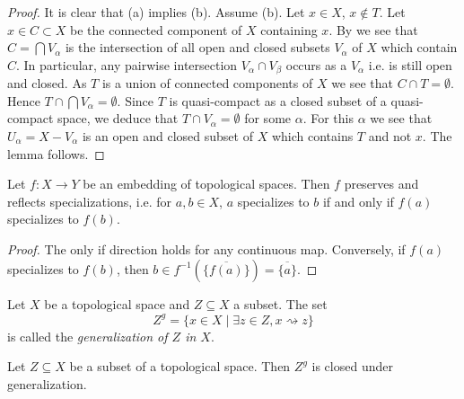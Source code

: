 \begin{proof}
  It is clear that (a) implies (b). Assume (b). Let $x \in X$, $x \notin T$. Let $x \in C \subset X$ be the connected component of $X$ containing $x$. By  we see that $C = \bigcap V_\alpha$ is the intersection of all open and closed subsets $V_\alpha$ of $X$ which contain $C$. In particular, any pairwise intersection $V_\alpha \cap V_\beta$ occurs as a $V_\alpha$ i.e. is still open and closed. As $T$ is a union of connected components of $X$ we see that $C \cap T = \emptyset$. Hence $T \cap \bigcap V_\alpha = \emptyset$. Since $T$ is quasi-compact as a closed subset of a quasi-compact space, we deduce that $T \cap V_\alpha = \emptyset$ for some $\alpha$. For this $\alpha$ we see that $U_\alpha = X - V_\alpha$ is an open and closed subset of $X$ which contains $T$ and not $x$. The lemma follows.
\end{proof}

\begin{lemma}
    Let $f\colon X \to Y$ be an embedding of topological spaces. Then $f$ preserves and reflects
    specializations, i.e. for $a, b \in X$, $a$ specializes to $b$ if and only if $f(a)$ specializes to $f(b)$.
    \label{lemma:embedding-specializations}
    \leanok
\end{lemma}

\begin{proof}
    \leanok
    The only if direction holds for any continuous map. Conversely, if $f(a)$ specializes to $f(b)$, then
    $b \in f^{-1}(\overline{\{f(a)\}}) = \overline{\{a\} }$.
\end{proof}

\begin{definition}
    Let $X$ be a topological space and $Z \subseteq X$ a subset. The set
    \[
    Z^g = \{ x \in X \mid \exists z \in Z, x \rightsquigarrow z \}
    \] is called the \emph{generalization of $Z$ in $X$}.
    \label{def:generalization}
    \leanok
\end{definition}

\begin{lemma}
    Let $Z \subseteq X$ be a subset of a topological space. Then $Z^g$ is closed under generalization.
    \label{lemma:generalization-stable-generalization}
    \leanok
\end{lemma}


